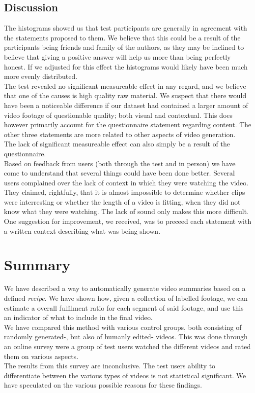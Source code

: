 \subsection{Discussion}
%
The histograms showed us that test participants are generally in agreement with the statements proposed to them. We believe that this could be a result of the participants being friends and family of the authors, as they may be inclined to believe that giving a positive answer will help us more than being perfectly honest. If we adjusted for this effect the histograms would likely have been much more evenly distributed.\\
%
The test revealed no significant measureable effect in any regard, and we believe that one of the causes is high quality raw material. We suspect that there would have been a noticeable difference if our dataset had contained a larger amount of video footage of questionable quality; both visual and contextual. This does however primarily account for the questionnaire statement regarding content. The other three statements are more related to other aspects of video generation.\\
The lack of significant measureable effect can also simply be a result of the questionnaire.\\
Based on feedback from users (both through the test and in person) we have come to understand that several things could have been done better. Several users complained over the lack of context in which they were watching the video. They claimed, rightfully, that it is almost impossible to determine whether clips were interresting or whether the length of a video is fitting, when they did not know what they were watching. The lack of sound only makes this more difficult. One suggestion for improvement, we received, was to preceed each statement with a written context describing what was being shown.
%
\section{Summary}
%
We have described a way to automatically generate video summaries based on a defined \textit{recipe}. We have shown how, given a collection of labelled footage, we can estimate a overall fulfilment ratio for each segment of said footage, and use this an indicator of what to include in the final video.\\
We have compared this method with various control groups, both consisting of randomly generated-, but also of humanly edited- videos. This was done through an online survey were a group of test users watched the different videos and rated them on various aspects.\\
The results from this survey are inconclusive. The test users ability to differentiate between the various types of videos is not statistical significant. We have speculated on the various possible reasons for these findings.\\
%

%